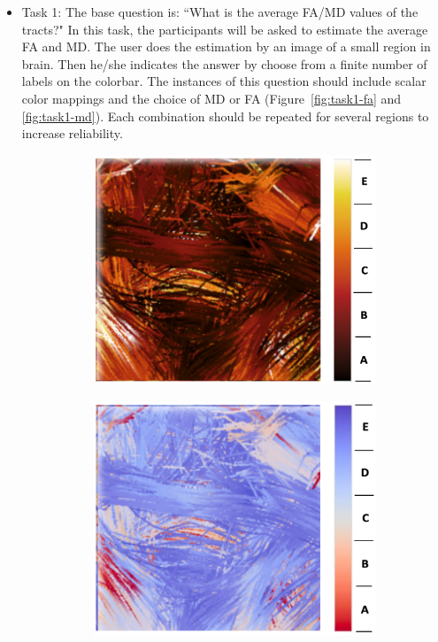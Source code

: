 \documentclass[a4paper, 12pt]{report}
\begin{document}
\begin{itemize}
	\item{Task 1:} The base question is: ``What is the average FA/MD values of the tracts?"
	In this task, the participants will be asked to estimate the average FA and MD. The user does the estimation by an image of a small region in brain. Then he/she indicates the answer by choose from a finite number of labels on the colorbar. The instances of this question should include scalar color mappings and the choice of MD or FA (Figure~\ref{fig:task1-fa} and \ref{fig:task1-md}). Each combination should be repeated for several regions to increase reliability. 
     	
\begin{figure}[ht]
    \centering
    \begin{subfigure}[b]{0.45\textwidth}
    	\includegraphics[width =  \columnwidth]{blackbody-fa}
	\caption{ }
    \end{subfigure}
    \hspace{0.3cm}
    \begin{subfigure}[b]{0.45\textwidth}
    	\includegraphics[width =  \columnwidth]{coolwarm-fa}

\end{subfigure}
\end{figure}
\end{itemize}
\end{document}
